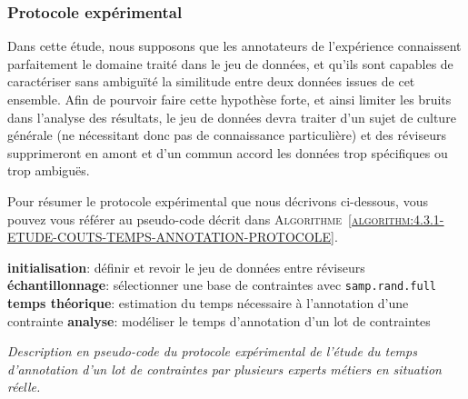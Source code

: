 		\subsubsection{Protocole expérimental}
			
			\begin{leftBarWarning}
				Dans cette étude, nous supposons que les annotateurs de l'expérience connaissent parfaitement le domaine traité dans le jeu de données, et qu'ils sont capables de caractériser sans ambiguïté la similitude entre deux données issues de cet ensemble.
				Afin de pourvoir faire cette hypothèse forte, et ainsi limiter les bruits dans l'analyse des résultats, le jeu de données devra traiter d'un sujet de culture générale (ne nécessitant donc pas de connaissance particulière) et des réviseurs supprimeront en amont et d'un commun accord les données trop spécifiques ou trop ambiguës.
			\end{leftBarWarning}
			
			Pour résumer le protocole expérimental que nous décrivons ci-dessous, vous pouvez vous référer au pseudo-code décrit dans \textsc{Algorithme~\ref{algorithm:4.3.1-ETUDE-COUTS-TEMPS-ANNOTATION-PROTOCOLE}}.

			\begin{algorithm}
				\textbf{initialisation}: définir et revoir le jeu de données entre réviseurs \;
				\textbf{échantillonnage}: sélectionner une base de contraintes avec \texttt{samp.rand.full} \;
				\textbf{temps théorique}: estimation du temps nécessaire à l'annotation d'une contrainte \;
				\textbf{analyse}: modéliser le temps d'annotation d'un lot de contraintes \;
				\caption{\textit{
					Description en pseudo-code du protocole expérimental de l'étude du temps d'annotation d'un lot de contraintes par plusieurs experts métiers en situation réelle.
				}}
				\label{algorithm:4.3.1-ETUDE-COUTS-TEMPS-ANNOTATION-PROTOCOLE}
			\end{algorithm}
			

